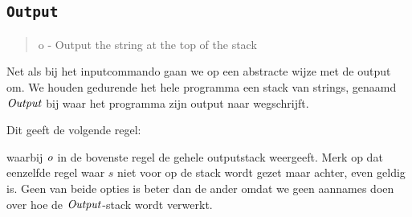 \subsection{\texttt{Output}}

\begin{quote}
	o - Output the string at the top of the stack
\end{quote}

Net als bij het inputcommando gaan we op een abstracte wijze met de output om.
We houden gedurende het hele programma een stack van strings, genaamd $\mathit{Output}$
bij waar het programma zijn output naar wegschrijft.

Dit geeft de volgende regel:
\theroutputns%

waarbij $\mathit{o}$ in de bovenste regel de gehele outputstack weergeeft. Merk op
dat eenzelfde regel waar $s$ niet voor op de stack wordt gezet maar achter,
even geldig is. Geen van beide opties is beter dan de ander omdat we geen
aannames doen over hoe de $\mathit{Output}$-stack wordt verwerkt.
